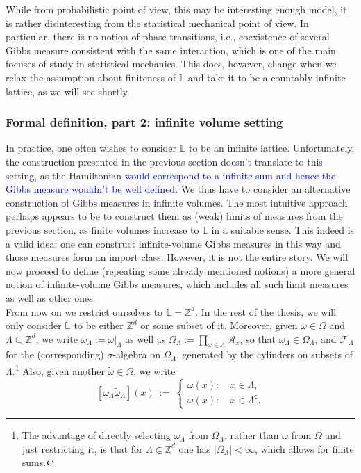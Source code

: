 \documentclass[12pt]{article}
\newcommand{\A}{\mathcal{A}}
\newcommand{\F}{\mathcal{F}}
\renewcommand{\L}{\mathbb{L}}
\newcommand{\Z}{\mathbb{Z}}
\newcommand{\1}{\mathbbm{1}}
\renewcommand{\c}{\mathsf{c}}
\newcommand{\5}{\vspace{0.5cm}}
\renewcommand{\tilde}{\widetilde}
\theoremstyle{definition}
\begin{document}
While from probabilistic point of view, this may be interesting enough model, it is rather disinteresting from the statistical mechanical point of view. In particular, there is no notion of phase transitions, i.e., coexistence of several Gibbs measure consistent with the same interaction, which is one of the main focuses of study in statistical mechanics. This does, however, change when we relax the assumption about finiteness of $\L$ and take it to be a countably infinite lattice, as we will see shortly.


\subsubsection{Formal definition, part 2: infinite volume setting}

In practice, one often wishes to consider $\L$ to be an infinite lattice. Unfortunately, the construction presented in the previous section doesn't translate to this setting, as the Hamiltonian \textcolor{blue}{would correspond to a infinite sum and hence the Gibbs measure wouldn't be well defined.} We thus have to consider an alternative construction of Gibbs measures in infinite volumes. The most intuitive approach perhaps appears to be to construct them as (weak) limits of measures from the previous section, as finite volumes increase to $\L$ in a suitable sense. This indeed is a valid idea: one can construct infinite-volume Gibbs measures in this way and those measures form an import class. However, it is not the entire story. We will now proceed to define (repeating some already mentioned notions) a more general notion of infinite-volume Gibbs measures, which includes all such limit measures as well as other ones. \\

From now on we restrict ourselves to $\L=\Z^d$. In the rest of the thesis, we will only consider $\L$ to be either $\Z^d$ or some subset of it. Moreover, given $\omega\in\Omega$ and $\Lambda\subseteq\Z^d$, we write $\omega_\Lambda:=\omega|_\Lambda$ as well as $\Omega_\Lambda:=\prod_{x\in\Lambda}\A_x$, so that $\omega_\Lambda\in\Omega_\Lambda$, and $\F_\Lambda$ for the (corresponding) $\sigma$-algebra on $\Omega_\Lambda$, generated by the cylinders on subsets of $\Lambda$.\footnote{The advantage of directly selecting $\omega_\Lambda$ from $\Omega_\Lambda$, rather than $\omega$ from $\Omega$ and just restricting it, is that for $\Lambda\Subset\Z^d$ one has $|\Omega_\Lambda|<\infty$, which allows for finite sums.} Also, given another $\tilde{\omega}\in\Omega$, we write $$[\omega_\Lambda\tilde{\omega}_\Lambda](x) ~:=~ \begin{cases}
\omega(x): ~&x\in\Lambda,\\
\tilde{\omega}(x): ~&x\in\Lambda^\c.
\end{cases}$$
\end{document}
